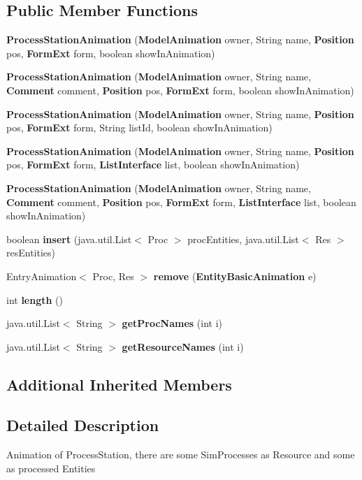 \subsection*{Public Member Functions}
\begin{DoxyCompactItemize}
\item 
{\bf Process\-Station\-Animation} ({\bf Model\-Animation} owner, String name, {\bf Position} pos, {\bf Form\-Ext} form, boolean show\-In\-Animation)
\item 
{\bf Process\-Station\-Animation} ({\bf Model\-Animation} owner, String name, {\bf Comment} comment, {\bf Position} pos, {\bf Form\-Ext} form, boolean show\-In\-Animation)
\item 
{\bf Process\-Station\-Animation} ({\bf Model\-Animation} owner, String name, {\bf Position} pos, {\bf Form\-Ext} form, String list\-Id, boolean show\-In\-Animation)
\item 
{\bf Process\-Station\-Animation} ({\bf Model\-Animation} owner, String name, {\bf Position} pos, {\bf Form\-Ext} form, {\bf List\-Interface} list, boolean show\-In\-Animation)
\item 
{\bf Process\-Station\-Animation} ({\bf Model\-Animation} owner, String name, {\bf Comment} comment, {\bf Position} pos, {\bf Form\-Ext} form, {\bf List\-Interface} list, boolean show\-In\-Animation)
\item 
boolean {\bf insert} (java.\-util.\-List$<$ Proc $>$ proc\-Entities, java.\-util.\-List$<$ Res $>$ res\-Entities)
\item 
Entry\-Animation$<$ Proc, Res $>$ {\bf remove} ({\bf Entity\-Basic\-Animation} e)
\item 
int {\bf length} ()
\item 
java.\-util.\-List$<$ String $>$ {\bf get\-Proc\-Names} (int i)
\item 
java.\-util.\-List$<$ String $>$ {\bf get\-Resource\-Names} (int i)
\end{DoxyCompactItemize}
\subsection*{Additional Inherited Members}


\subsection{Detailed Description}
Animation of Process\-Station, there are some Sim\-Processes as Resource and some as processed Entities

